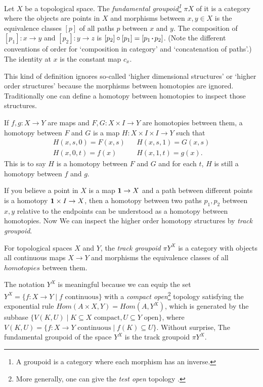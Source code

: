 \begin{definition}
    \label{fundamental-groupoid}
    Let $X$ be a topological space. The {\it fundamental groupoid\footnote{
        A groupoid is a category where each morphism has an inverse.
    }} $\pi X$ of it is
    a category where the objects are points in $X$ and morphisms
    between $x,y\in X$ is the equivalence classes $[p]$ of all paths
    $p$ between $x$ and $y$.
    The composition of $[p_1]: x\to y$ and $[p_2]:y\to z$ is
    $[p_2]\circ[p_1]=[p_1\concat p_2]$. (Note the different conventions
    of order for `composition in category' and `concatenation of paths'.)
    The identity at $x$ is the constant map $c_x$.
\end{definition}

This kind of definition ignores so-called `higher dimensional structures' 
or `higher order structures' because the morphisms between homotopies are
ignored. Traditionally one can define a homotopy between homotopies to
inspect those structures.

\begin{definition}
    If $f,g:X\to Y$ are maps and $F,G: X\times I\to Y$ are homotopies 
    between them, a homotopy between $F$ and $G$ is a map 
    $H: X\times I\times I\to Y$ such that
    $$
    \begin{array}{lcl}
        H(x,s,0) = F(x, s) & & H(x, s, 1) = G(x, s) \\
        H(x, 0, t) = f(x) & & H(x,1,t) = g(x).
    \end{array}
    $$
    This is to say $H$ is a homotopy between $F$ and $G$ and for each
    $t$, $H$ is still a homotopy between $f$ and $g$.
\end{definition}

If you believe a point in $X$ is a map $\mathbf{1}\to X$ and a path between
different points is a homotopy $\mathbf{1}\times I\to X$, then a homotopy
between two paths $p_1,p_2$ between $x,y$ relative to the endpoints
can be understood as a homotopy between homotopies.  
Now We can inspect the higher order homotopy structures by {\it track
groupoid}.

\begin{definition}
    For topological spaces $X$ and $Y$, the {\it track groupoid} $\pi Y^X$
    is a category with objects all continuous maps $X\to Y$ and morphisms
    the equivalence classes of all $homotopies$ between them. 
\end{definition}

The notation $Y^X$ is meaningful because we can equip the set $Y^X=\{
f: X\to Y\mid f\text{ continuous}\}$ with a {\it compact open}\footnote{
More generally, one can give the {\it test open} topology 
\cite{topology-and-groupoids}.} topology satisfying the exponential rule
$Hom(A\times X, Y)=Hom(A, Y^X)$, which is generated by the subbase
$\{V(K, U)\mid K\subseteq X\text{ compact},U\subseteq Y\text{ open}\}$,
where $V(K, U) = \{f: X\to Y\text{ continuous}\mid f(K)\subseteq U\}$.
Without surprise, The fundamental groupoid of the space $Y^X$ is the
track groupoid $\pi Y^X$. 

